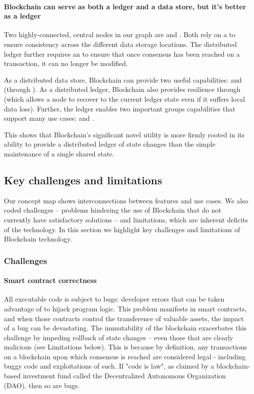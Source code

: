 {\paragraph{Blockchain can serve as both a ledger and a data store, but it's better as a ledger}
Two highly-connected, central nodes in our graph are  and . Both rely on a  to ensure consistency across the different data storage locations. The distributed ledger further requires an  to ensure that once consensus has been reached on a transaction, it can no longer be modified. 

As a distributed data store, Blockchain can provide two useful capabilities:  and  (through ). As a distributed ledger, Blockchain also provides resilience through  (which allows a node to recover to the current ledger state even if it suffers local data loss). Further, the ledger enables two important groups capabilities that support many use cases:  and . 

This shows that Blockchain's significant novel utility is more firmly rooted in its ability to provide a distributed ledger of state changes than the simple maintenance of a single shared state.

\subsection{Key challenges and limitations}
\label{subsec:challenges}
Our concept map shows interconnections between features and use cases. We also coded challenges -- problems hindering the use of Blockchain that do not currently have satisfactory solutions -- and limitations, which are inherent deficits of the technology. In this section we highlight key challenges and limitations of Blockchain technology.

\subsubsection{Challenges}
\paragraph{Smart contract correctness}
All executable code is subject to bugs: developer errors that can be taken advantage of to hijack program logic. This problem manifests in smart contracts, and when those contracts control the transference of valuable assets, the impact of a bug can be devastating. The immutability of the blockchain exacerbates this challenge by impeding rollback of state changes -- even those that are clearly malicious (see Limitations below). This is because by definition, any transactions on a blockchain upon which consensus is reached are considered legal - including buggy code and exploitations of such. If "code is law", as claimed by a blockchain-based investment fund called the Decentralized Autonomous Organization (DAO), then so are bugs. 

}
